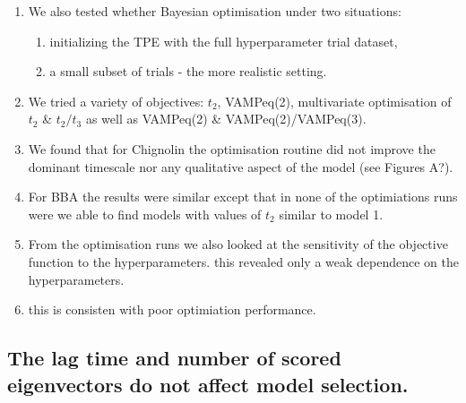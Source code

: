\documentclass[journal=jacsat,manuscript=article]{achemso}
\begin{document}
\begin{enumerate}
    \item We also tested whether Bayesian optimisation under two situations: 
    \begin{enumerate}
        \item initializing the TPE with the full hyperparameter trial dataset,
        \item a small subset of trials - the more realistic setting. 
    \end{enumerate}
    \item We tried a variety of objectives: $t_2$, VAMPeq(2), multivariate optimisation of $t_2$ \& $t_2/t_3$ as well as VAMPeq(2) \& VAMPeq(2)/VAMPeq(3).  
    \item We found that for Chignolin the optimisation routine did not improve the dominant timescale nor any qualitative aspect of the model (see Figures A?). 
    \item For BBA the results were similar except that in none of the optimiations runs were we  able to find models with values of $t_2$ similar to model 1.  
    \item From the optimisation runs we also looked at the sensitivity of the objective function to the hyperparameters. this revealed only a  weak dependence on the hyperparameters. 
    \item this is consisten with poor optimiation performance. 
\end{enumerate}






\subsection{The lag time and number of scored eigenvectors do not affect model selection.}\label{sec:lag_evs_selection}
\end{document}
